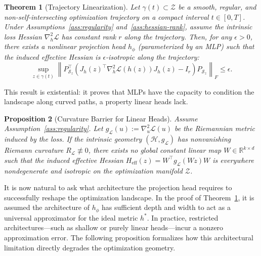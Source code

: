 \documentclass{article}
\theoremstyle{plain}
\newtheorem{theorem}{Theorem}[section]
\newtheorem{proposition}[theorem]{Proposition}
\theoremstyle{definition}
\theoremstyle{remark}
\begin{document}
\begin{theorem}[Trajectory Linearization]
\label{thm:nonlinear-adaptation}
Let $\gamma(t) \subset \mathcal{Z}$ be a smooth, regular, and non-self-intersecting optimization trajectory on a compact interval $t \in [0,T]$. Under Assumptions~\ref{ass:regularity} and~\ref{ass:hessian-rank}, assume the intrinsic loss Hessian $\nabla_h^2 \mathcal{L}$ has constant rank $r$ along the trajectory. Then, for any $\epsilon > 0$, there exists a nonlinear projection head $h_\phi$ (parameterized by an MLP) such that the induced effective Hessian is $\epsilon$-isotropic along the trajectory:
\begin{equation*}
    \sup_{z \in \gamma(t)} \left\| P_{\mathcal{S}_z}^\top \left( J_h(z)^\top \nabla_h^2 \mathcal{L}(h(z)) J_h(z) - I_r \right) P_{\mathcal{S}_z} \right\|_F \le \epsilon.
\end{equation*}
\end{theorem}

This result is existential: it proves that MLPs have the capacity to condition the landscape along curved paths, a property linear heads lack.

\begin{proposition}[Curvature Barrier for Linear Heads]
\label{prop:linear-curvature-barrier}
Assume Assumption~\ref{ass:regularity}. Let $g_{\mathcal{L}}(u) := \nabla_u^2 \mathcal{L}(u)$ be the Riemannian metric induced by the loss. If the intrinsic geometry $(\mathcal{H}, g_{\mathcal{L}})$ has nonvanishing Riemann curvature $R_{\mathcal{L}} \not\equiv 0$, there exists no global constant linear map $W \in \mathbb{R}^{k \times d}$ such that the induced effective Hessian $H_{\text{eff}}(z) = W^{\top} g_{\mathcal{L}}(Wz) W$ is everywhere nondegenerate and isotropic on the optimization manifold $\mathcal{Z}$.
\end{proposition}

It is now natural to ask what architecture the projection head requires to successfully reshape the optimization landscape. In the proof of Theorem~\ref{thm:nonlinear-adaptation}, it is assumed the architecture of $h_\phi$ has sufficient depth and width to act as a universal approximator for the ideal metric $h^*$. In practice, restricted architectures---such as shallow or purely linear heads---incur a nonzero approximation error. The following proposition formalizes how this architectural limitation directly degrades the optimization geometry.
\end{document}
